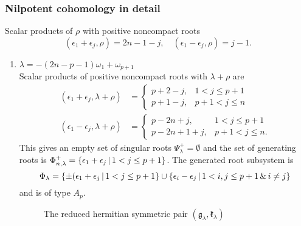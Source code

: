 \subsubsection{Nilpotent cohomology in detail}

Scalar products of $\rho$ with positive noncompact roots
\begin{equation}\label{eq:Dn_rho_scalar_posroots}
 (\epsilon_1 + \epsilon_j, \rho) = 2n-1-j, \quad (\epsilon_1 - \epsilon_j, \rho) = j -1.
\end{equation}


\begin{enumerate}
 \item $ \lambda =  -(2n-p-1)\omega_1+\omega_{p+1}$\\
   Scalar products of positive noncompact roots with $\lambda+\rho$ are
  \begin{align*}
    (\epsilon_1 + \epsilon_j, \lambda+\rho) & = \begin{cases}
                                                 p+2-j, & 1<j\leq p+1 \\
                                                 p+1-j, & p+1<j\leq n
                                                \end{cases}\\
    (\epsilon_1 - \epsilon_j, \lambda+\rho) & = \begin{cases}
                                                 p-2n+j, & 1<j\leq p+1 \\
                                                 p-2n+1+j, & p+1<j\leq n.
                                                \end{cases}
  \end{align*}
  This gives an empty set of singular roots $\Psi^+_\lambda = \emptyset$ and the set of generating roots is $\Phi^+_{n,\lambda} = \{\epsilon_1 + \epsilon_j \,|\, 1<j\leq p+1 \}$. The generated root subsystem is
  \[
   \Phi_\lambda = \{ \pm(\epsilon_1 + \epsilon_j \,|\, 1<j\leq p+1 \} \cup \{ \epsilon_i - \epsilon_j \,|\, 1 < i,j \leq p+1 \,\&\, i\neq j \}
  \]
  and is of type $A_p$.

\begin{figure}[H]
\centering
{}  
  \caption{The reduced hermitian symmetric pair $(\mathfrak{g}_\lambda, \mathfrak{k}_\lambda)$}
\end{figure}
  

\end{enumerate}
